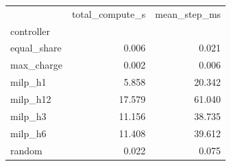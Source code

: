 \begin{tabular}{lrr}
\toprule
 & total_compute_s & mean_step_ms \\
controller &  &  \\
\midrule
equal_share & 0.006 & 0.021 \\
max_charge & 0.002 & 0.006 \\
milp_h1 & 5.858 & 20.342 \\
milp_h12 & 17.579 & 61.040 \\
milp_h3 & 11.156 & 38.735 \\
milp_h6 & 11.408 & 39.612 \\
random & 0.022 & 0.075 \\
\bottomrule
\end{tabular}
